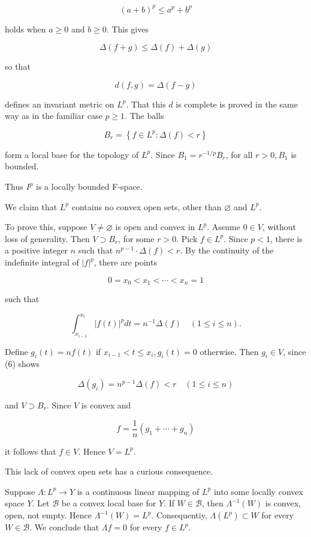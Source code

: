 \documentclass[10pt]{article}
\begin{document}
$$
(a+b)^{p} \leq a^{p}+b^{p}
$$

holds when $a \geq 0$ and $b \geq 0$. This gives

$$
\Delta(f+g) \leq \Delta(f)+\Delta(g)
$$

so that

$$
d(f, g)=\Delta(f-g)
$$

defines an invariant metric on $L^{p}$. That this $d$ is complete is proved in the same way as in the familiar case $p \geq 1$. The balls

$$
B_{r}=\left\{f \in L^{p}: \Delta(f)<r\right\}
$$

form a local base for the topology of $L^{p}$. Since $B_{1}=r^{-1 / p} B_{r}$, for all $r>0, B_{1}$ is bounded.

Thus $I^{p}$ is a locally bounded F-space.

We claim that $L^{p}$ contains no convex open sets, other than $\varnothing$ and $L^{p}$.

To prove this, suppose $V \neq \varnothing$ is open and convex in $L^{p}$. Assume $0 \in V$, without loss of generality. Then $V \supset B_{r}$, for some $r>0$. Pick $f \in L^{p}$. Since $p<1$, there is a positive integer $n$ such that $n^{p-1} \cdot \Delta(f)<r$. By the continuity of the indefinite integral of $|f|^{p}$, there are points

$$
0=x_{0}<x_{1}<\cdots<x_{n}=1
$$

such that

$$
\int_{x_{i-1}}^{x_{i}}|f(t)|^{p} d t=n^{-1} \Delta(f) \quad(1 \leq i \leq n) .
$$

Define $g_{i}(t)=n f(t)$ if $x_{i-1}<t \leq x_{i}, g_{i}(t)=0$ otherwise. Then $g_{i} \in V$, since (6) shows

$$
\Delta\left(g_{i}\right)=n^{p-1} \Delta(f)<r \quad(1 \leq i \leq n)
$$

and $V \supset B_{r}$. Since $V$ is convex and

$$
f=\frac{1}{n}\left(g_{1}+\cdots+g_{n}\right)
$$

it follows that $f \in V$. Hence $V=L^{p}$.

This lack of convex open sets has a curious consequence.

Suppose $\Lambda: L^{p} \rightarrow Y$ is a continuous linear mapping of $L^{p}$ into some locally convex space $Y$. Let $\mathscr{B}$ be a convex local base for $Y$. If $W \in \mathscr{B}$, then $\Lambda^{-1}(W)$ is convex, open, not empty. Hence $\Lambda^{-1}(W)=L^{p}$. Consequentiy, $\Lambda\left(L^{p}\right) \subset W$ for every $W \in \mathscr{B}$. We conclude that $\Lambda f=0$ for every $f \in L^{p}$.
\end{document}
